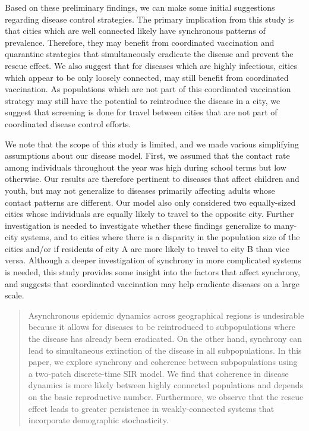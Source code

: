 \documentclass[12pt]{article}
\begin{document}
Based on these preliminary findings, we can make some initial suggestions regarding disease control strategies. The primary implication from this study is that cities which are well connected likely have synchronous patterns of prevalence. Therefore, they may benefit from coordinated vaccination and quarantine strategies that simultaneously eradicate the disease and prevent the rescue effect. We also suggest that for diseases which are highly infectious, cities which appear to be only loosely connected, may still benefit from coordinated vaccination. As populations which are not part of this coordinated vaccination strategy may still have the potential to reintroduce the disease in a city, we suggest that screening is done for travel between cities that are not part of coordinated disease control efforts.

We note that the scope of this study is limited, and we made various simplifying assumptions about our disease model. First, we assumed that the contact rate among individuals throughout the year was high during school terms but low otherwise. Our results are therefore pertinent to diseases that affect children and youth, but may not generalize to diseases primarily affecting adults whose contact patterns are different. Our model also only considered two equally-sized cities whose individuals are equally likely to travel to the opposite city. Further investigation is needed to investigate whether these findings generalize to many-city systems, and to cities where there is a disparity in the population size of the cities and/or if residents of city A are more likely to travel to city B than vice versa. Although a deeper investigation of synchrony in more complicated systems is needed, this study provides some insight into the factors that affect synchrony, and suggests that coordinated vaccination may help eradicate diseases on a large scale.
\newpage

\begin{abstract}
Asynchronous epidemic dynamics across geographical regions is undesirable because it allows for diseases to be reintroduced to subpopulations where the disease has already been eradicated.
On the other hand, synchrony can lead to simultaneous extinction of the disease in all subpopulations.
In this paper, we explore synchrony and coherence between subpopulations using a two-patch discrete-time SIR model.
We find that coherence in disease dynamics is more likely between highly connected populations and depends on the basic reproductive number. 
Furthermore, we observe that the rescue effect leads to greater persistence in weakly-connected systems that incorporate demographic stochasticity.  
\end{abstract}
\end{document}
